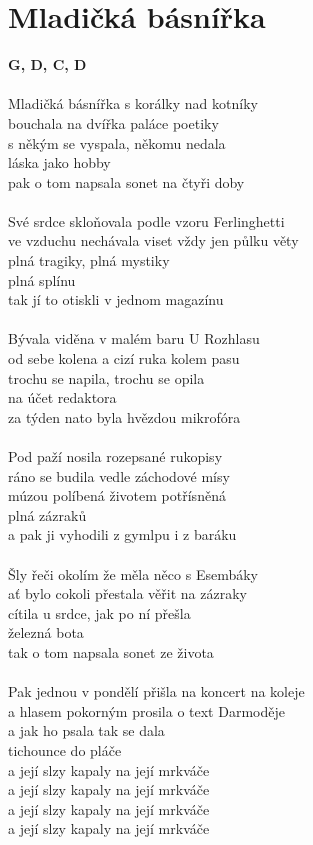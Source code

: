 \section{Mladičká básnířka}
\footnotesize\textbf{G, D, C, D}\\
\\
\normalsize
{}Mladičká básnířka s korálky nad kotníky\\
bouchala na dvířka paláce poetiky\\
s někým se vyspala, někomu nedala\\
láska jako hobby\\
pak o tom napsala sonet na čtyři doby\\
\\
Své srdce skloňovala podle vzoru Ferlinghetti\\
ve vzduchu nechávala viset vždy jen půlku věty\\
plná tragiky, plná mystiky\\
plná splínu\\
tak jí to otiskli v jednom magazínu\\
\\
Bývala viděna v malém baru U Rozhlasu\\
od sebe kolena a cizí ruka kolem pasu\\
trochu se napila, trochu se opila\\
na účet redaktora\\
za týden nato byla hvězdou mikrofóra\\
\\
Pod paží nosila rozepsané rukopisy\\
ráno se budila vedle záchodové mísy\\
múzou políbená životem potřísněná\\
plná zázraků\\
a pak ji vyhodili z gymlpu i z baráku\\
\\
Šly řeči okolím že měla něco s Esembáky\\
ať bylo cokoli přestala věřit na zázraky\\
cítila u srdce, jak po ní přešla\\
železná bota\\
tak o tom napsala sonet ze života\\
\\
Pak jednou v pondělí přišla na koncert na koleje\\
a hlasem pokorným prosila o text Darmoděje\\
a jak ho psala tak se dala\\
tichounce do pláče\\
a její slzy kapaly na její mrkváče\\
a její slzy kapaly na její mrkváče\\
a její slzy kapaly na její mrkváče\\
a její slzy kapaly na její mrkváče\\
